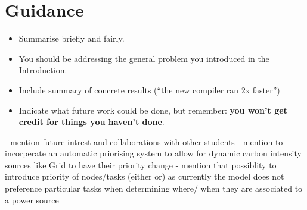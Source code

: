 \documentclass{l4proj}
\begin{document}
\section{Guidance}
\begin{itemize}
    \item
        Summarise briefly and fairly.
    \item
        You should be addressing the general problem you introduced in the
        Introduction.        
    \item
        Include summary of concrete results (``the new compiler ran 2x
        faster'')
    \item
        Indicate what future work could be done, but remember: \textbf{you
        won't get credit for things you haven't done}.
\end{itemize}
- mention future intrest and collaborations with other students
- mention to incorperate an automatic priorising system to allow for dynamic carbon intensity sources like Grid to have their priority change
- mention that possiblity to introduce priority of nodes/tasks (either or) as currently the model does not preference particular tasks when determining where/ when they are associated to a power source
%
% 
\end{document}
